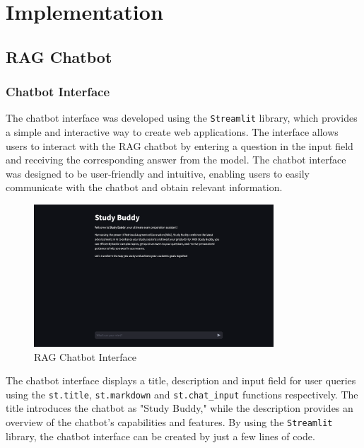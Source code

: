 \chapter{Implementation}
\section{RAG Chatbot}
    \subsection{Chatbot Interface}
        The chatbot interface was developed using the \texttt{Streamlit} library, which provides a simple and interactive way to create web applications. The interface allows users to interact with the RAG chatbot by entering a question in the input field and receiving the corresponding answer from the model. The chatbot interface was designed to be user-friendly and intuitive, enabling users to easily communicate with the chatbot and obtain relevant information.
        \begin{figure}[H]
            \centering
            \includegraphics[width=0.8\textwidth]{figs/interface.png}
            \caption{RAG Chatbot Interface}
            \label{fig:chatbot_interface}
        \end{figure}
            
            The chatbot interface displays a title, description and input field for user queries using the \texttt{st.title}, \texttt{st.markdown} and \texttt{st.chat\_input} functions respectively. The title introduces the chatbot as "Study Buddy," while the description provides an overview of the chatbot's capabilities and features. By using the \texttt{Streamlit} library, the chatbot interface can be created by just a few lines of code.

